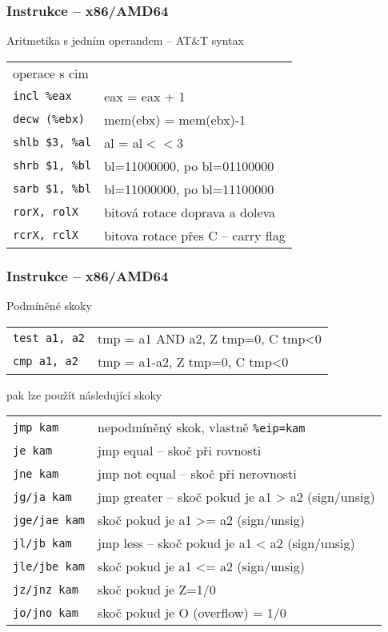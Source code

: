 \documentclass{beamer}
\begin{document}
\begin{frame}
\frametitle{Instrukce – x86/AMD64}
Aritmetika s jedním operandem -- AT\&T syntax
\begin{tabular}{ l l}
operace   s cim&\\
\texttt{incl            \%eax} &              eax = eax + 1\\
\texttt{decw            (\%ebx)} &                 mem(ebx) = mem(ebx)-1\\
\texttt{shlb            \$3, \%al} &                al = al$<<$3\\
\texttt{shrb            \$1, \%bl} &                bl=11000000, po bl=01100000\\
\texttt{sarb            \$1, \%bl} &                bl=11000000, po bl=11100000\\
\texttt{rorX, rolX} & bitová rotace doprava a doleva\\
\texttt{rcrX, rclX} & bitova rotace přes C -- carry flag\\
\end{tabular}
\end{frame}


\begin{frame}
\frametitle{Instrukce – x86/AMD64}
Podmíněné skoky\\
\begin{tabular}{ l l}
\texttt{test    a1, a2} &  tmp = a1 AND a2, Z tmp=0, C tmp<0\\
\texttt{cmp     a1, a2} &  tmp = a1-a2, Z tmp=0, C tmp<0\\
\end{tabular}

pak lze použít následující skoky
\begin{tabular}{ l l}
\texttt{jmp kam} & nepodmíněný skok, vlastně \texttt{\%eip=kam}\\
\texttt{je      kam} & jmp equal -- skoč při rovnosti\\
\texttt{jne kam} & jmp not equal -- skoč při nerovnosti\\
\texttt{jg/ja kam} & jmp greater – skoč pokud je a1 > a2 (sign/unsig)\\
\texttt{jge/jae kam} & skoč pokud je a1 >= a2 (sign/unsig)\\
\texttt{jl/jb kam} & jmp less – skoč pokud je a1 < a2 (sign/unsig)\\
\texttt{jle/jbe kam} & skoč pokud je a1 <= a2 (sign/unsig)\\
\texttt{jz/jnz kam} & skoč pokud je Z=1/0\\
\texttt{jo/jno kam}& skoč pokud je O (overflow) = 1/0\\
\end{tabular}
\end{frame}
\end{document}
